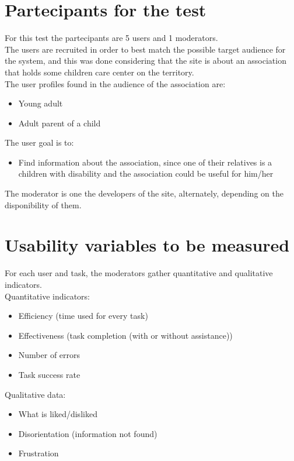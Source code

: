 \section{Partecipants for the test}
For this test the partecipants are 5 users and 1 moderators.\\
The users are recruited in order to best match the possible target audience for the system, and this was done considering that the site is about an association that holds some children care center on the territory.\\
The user profiles found in the audience of the association are: 
\begin{itemize}
\item Young adult
\item Adult parent of a child
\end{itemize}
The user goal is to:
\begin{itemize}
\item Find information about the association, since one of their relatives is a children with disability and the association could be useful for him/her
\end{itemize}
The moderator is one the developers of the site, alternately, depending on the disponibility of them.
%
%
\section{Usability variables to be measured}
For each user and task, the moderators gather quantitative and qualitative indicators.\\
Quantitative indicators:
\begin{itemize}
\item Efficiency (time used for every task)
\item Effectiveness (task completion (with or without assistance))
\item Number of errors
\item Task success rate
\end{itemize}
Qualitative data:
\begin{itemize}
\item What is liked/disliked
\item Disorientation (information not found)
\item Frustration
\end{itemize}
%
%
